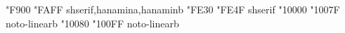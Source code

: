 \documentclass{article}
\begin{document}
                   {  "F900} {  "FAFF} {shserif,hanamina,hanaminb}
                        {  "FE30} {  "FE4F} {shserif}
                             { "10000} { "1007F} {noto-linearb}
                             { "10080} { "100FF} {noto-linearb}
\end{document}
